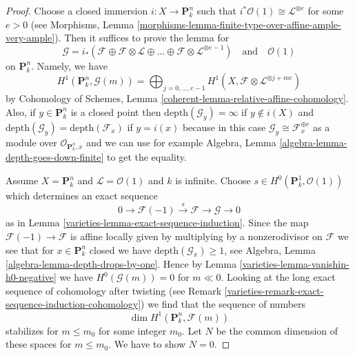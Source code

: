 \begin{proof}

Choose a closed immersion $i : X \to \mathbf{P}^n_k$ such that
$i^*\mathcal{O}(1) \cong \mathcal{L}^{\otimes e}$ for some $e > 0$
(see Morphisms, Lemma
\ref{morphisms-lemma-finite-type-over-affine-ample-very-ample}).
Then it suffices to prove the lemma for
$$
\mathcal{G} =
i_*(\mathcal{F} \oplus \mathcal{F} \otimes \mathcal{L} \oplus \ldots
\oplus \mathcal{F} \otimes \mathcal{L}^{\otimes e - 1})
\quad\text{and}\quad \mathcal{O}(1)
$$
on $\mathbf{P}^n_k$. Namely, we have
$$
H^1(\mathbf{P}^n_k, \mathcal{G}(m)) =
\bigoplus\nolimits_{j = 0, \ldots, e - 1}
H^1(X, \mathcal{F} \otimes \mathcal{L}^{\otimes j + me})
$$
by
Cohomology of Schemes, Lemma \ref{coherent-lemma-relative-affine-cohomology}.
Also, if $y \in \mathbf{P}^n_k$ is a closed point then
$\text{depth}(\mathcal{G}_y) = \infty$ if $y \not \in i(X)$
and $\text{depth}(\mathcal{G}_y) = \text{depth}(\mathcal{F}_x)$
if $y = i(x)$ because in this case
$\mathcal{G}_y \cong \mathcal{F}_x^{\oplus e}$ as a module over
$\mathcal{O}_{\mathbf{P}^n_k, x}$ and we can use for example
Algebra, Lemma \ref{algebra-lemma-depth-goes-down-finite}
to get the equality.

\medskip\noindent
Assume $X = \mathbf{P}^n_k$ and $\mathcal{L} = \mathcal{O}(1)$ and
$k$ is infinite. Choose $s \in H^0(\mathbf{P}^1_k, \mathcal{O}(1))$
which determines an exact sequence
$$
0 \to \mathcal{F}(-1) \xrightarrow{s} \mathcal{F} \to \mathcal{G} \to 0
$$
as in Lemma \ref{varieties-lemma-exact-sequence-induction}. Since the map
$\mathcal{F}(-1) \to \mathcal{F}$ is affine locally given by
multiplying by a nonzerodivisor on $\mathcal{F}$
we see that for $x \in \mathbf{P}^n_k$ closed we have
$\text{depth}(\mathcal{G}_x) \geq 1$, see
Algebra, Lemma \ref{algebra-lemma-depth-drops-by-one}.
Hence by Lemma \ref{varieties-lemma-vanishin-h0-negative}
we have $H^0(\mathcal{G}(m)) = 0$ for $m \ll 0$.
Looking at the long exact sequence of cohomology after twisting
(see Remark \ref{varieties-remark-exact-sequence-induction-cohomology})
we find that the sequence of numbers
$$
\dim H^1(\mathbf{P}^n_k, \mathcal{F}(m))
$$
stabilizes for $m \leq m_0$ for some integer $m_0$.
Let $N$ be the common dimension of these
spaces for $m \leq m_0$. We have to show $N = 0$.


\end{proof}
